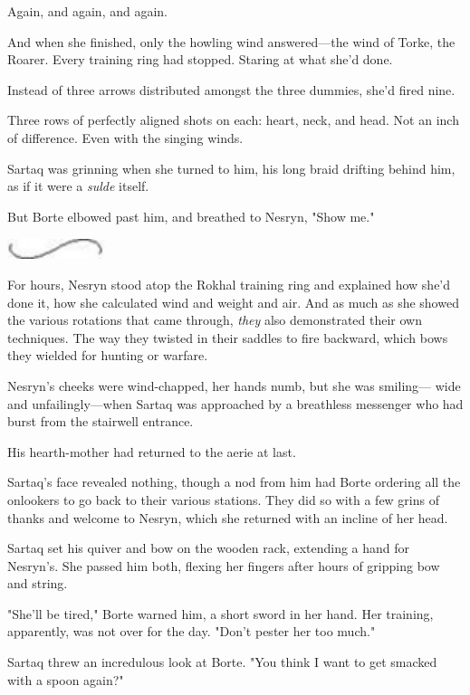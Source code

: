 Again, and again, and again.

And when she finished, only the howling wind answered---the wind of Torke, the Roarer.
Every training ring had stopped.
Staring at what she'd done.

Instead of three arrows distributed amongst the three dummies, she'd fired nine.

Three rows of perfectly aligned shots on each: heart, neck, and head.
Not an inch of difference.
Even with the singing winds.

Sartaq was grinning when she turned to him, his long braid drifting behind him, as if it were a \emph{sulde} itself.

But Borte elbowed past him, and breathed to Nesryn, "Show me."

\begin{center}
	\includegraphics[width=1.12in,height=0.24in]{images/seperator}
\end{center}

For hours, Nesryn stood atop the Rokhal training ring and explained how she'd done it, how she calculated wind and weight and air.
And as much as she showed the various rotations that came through, \emph{they} also demonstrated their own techniques.
The way they twisted in their saddles to fire backward, which bows they wielded for hunting or warfare.

Nesryn's cheeks were wind-chapped, her hands numb, but she was smiling--- wide and unfailingly---when Sartaq was approached by a breathless messenger who had burst from the stairwell entrance.

His hearth-mother had returned to the aerie at last.

Sartaq's face revealed nothing, though a nod from him had Borte ordering all the onlookers to go back to their various stations.
They did so with a few grins of thanks and welcome to Nesryn, which she returned with an incline of her head.

Sartaq set his quiver and bow on the wooden rack, extending a hand for Nesryn's.
She passed him both, flexing her fingers after hours of gripping bow and string.

"She'll be tired," Borte warned him, a short sword in her hand.
Her training, apparently, was not over for the day.
"Don't pester her too much."

Sartaq threw an incredulous look at Borte.
"You think I want to get smacked with a spoon again?"

